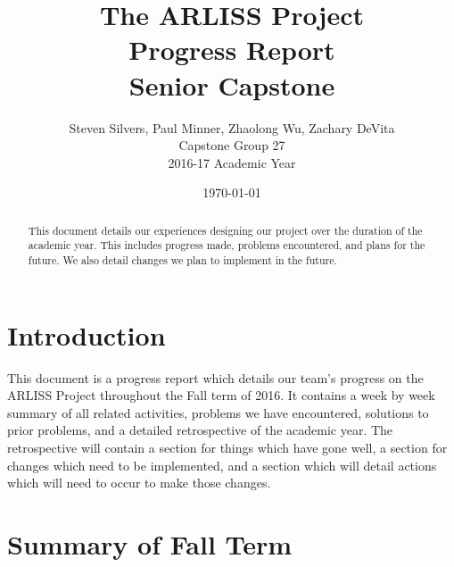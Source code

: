 \documentclass[10pt,letterpaper,onecolumn,draftclsnofoot,journal]{IEEEtran}
\begin{document}
\begin{titlepage}
	\title{The ARLISS Project\\Progress Report\\Senior Capstone}
	\author{Steven Silvers, Paul Minner, Zhaolong Wu, Zachary DeVita\\
		Capstone Group 27\\2016-17 Academic Year}
	\date{\today}
	\maketitle
	\vspace{4cm}
	\begin{abstract}
		\noindent This document details our experiences designing our project over the duration of the academic year. This includes progress made, problems encountered, and plans for the future. We also detail changes we plan to implement in the future.
	\end{abstract}

\end{titlepage}
\tableofcontents
\clearpage

\section{Introduction}
This document is a progress report which details our team's progress on the ARLISS Project throughout the Fall term of 2016. It  contains a week by week summary of all related activities, problems we have encountered, solutions to prior problems, and a detailed retrospective of the academic year. The retrospective will contain a section for things which have gone well, a section for changes which need to be implemented, and a section which will detail actions which will need to occur to make those changes.  

\section{Summary of Fall Term}
\end{document}
